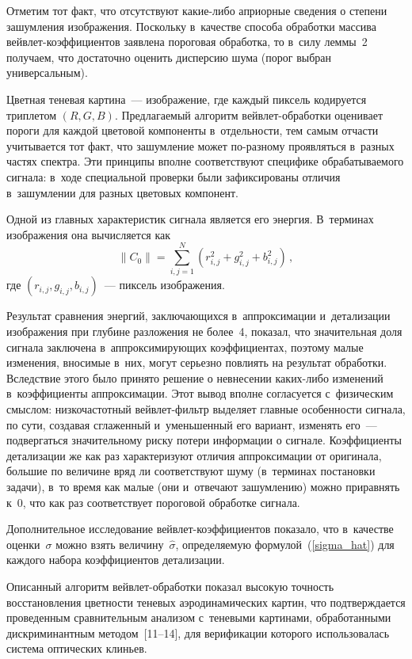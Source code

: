 \begin{multicols}{2}
Отметим тот факт, что отсутствуют ка\-кие-ли\-бо априорные сведения о степени 
зашумления изображения. Поскольку в~качестве способа обработки массива 
вейв\-лет-ко\-эф\-фи\-ци\-ен\-тов заявлена пороговая обработка, то в~силу 
леммы~2 получаем, что достаточно оценить дисперсию шума (порог выбран универсальным).

Цветная теневая картина~--- изображение, где каждый пиксель кодируется 
триплетом $(R,G,B)$. Предлагаемый алгоритм вейв\-лет-об\-ра\-бот\-ки 
оценивает пороги для каждой цветовой компоненты в~отдельности, тем 
самым отчасти учитывается тот факт, что зашумление может по-раз\-но\-му 
проявляться в~разных частях спектра. Эти принципы вполне соответствуют специфике 
обрабатываемого сигнала: в~ходе специальной проверки были зафиксированы отличия 
в~зашумлении для разных цветовых компонент.

Одной из главных характеристик сигнала является его энергия. 
В~терминах изображения она вычисляется как
\begin{equation}
    \left\|C_0\right\|=\sum\limits_{i,j=1}^{N}
    \left({r_{i,j}^2+g_{i,j}^2+b_{i,j}^2}\right)\,,
\label{image_energy}
\end{equation}
где $(r_{i,j},g_{i,j},b_{i,j})$~--- пиксель изображения.

Результат сравнения энергий, заключающихся в~аппроксимации и~детализации 
изображения при глубине разложения не более~4, показал, что значительная доля 
сигнала заключена в~аппроксимирующих коэффициентах, поэтому малые изменения, 
вносимые в~них, могут серьезно повлиять на результат обработки. 
Вследствие этого было принято решение о невнесении ка\-ких-ли\-бо изменений 
в~коэффициенты аппроксимации. Этот вывод вполне согласуется с~физическим смыслом: 
низкочастотный вейв\-лет-фильтр выделяет главные особенности сигнала, по сути, 
создавая сглаженный и~уменьшенный его вариант, изменять его~--- 
подвергаться значительному риску потери информации о сигнале. Коэффициенты 
детализации же как раз характеризуют отличия аппроксимации от оригинала, 
большие по величине вряд ли соответствуют шуму (в~терминах постановки задачи), 
в~то время как малые (они и~отвечают зашумлению) можно приравнять к~0, 
что как раз соответствует пороговой обработке сигнала.

Дополнительное исследование вейв\-лет-ко\-эф\-фи\-ци\-ен\-тов показало, 
что в~качестве оценки~$\sigma$ можно взять величину~$\hat{\sigma}$, определяемую 
формулой~(\ref{sigma_hat}) для каждого набора коэффициентов детализации.


Описанный алгоритм вейв\-лет-об\-ра\-бот\-ки показал высокую точность
восстановления цвет\-ности теневых аэродинамических картин, что
подтверждается проведенным сравнительным анализом с~теневыми
картинами, обработанными дискриминантным методом~[11--14], для
верификации которого использовалась система оптических \mbox{клиньев}.



\end{multicols}
